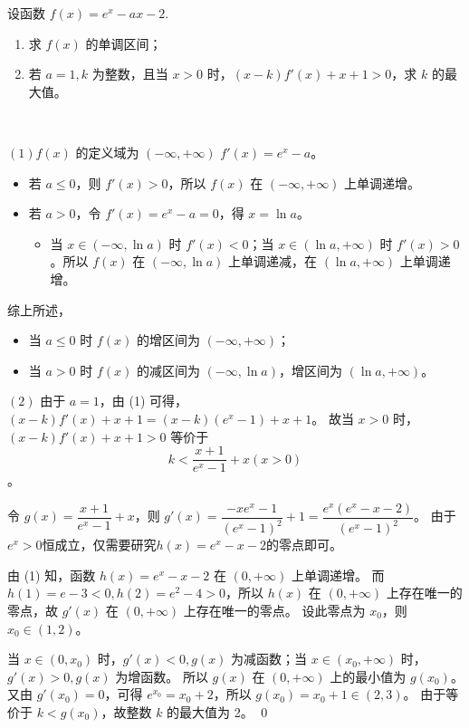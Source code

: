 \begin{example}[2012课标全国卷]
    设函数 $f(x) = e^x - ax - 2$.

\begin{enumerate}
    \item 求 $f(x)$ 的单调区间；
    \item 若 $a = 1, k$ 为整数，且当 $x > 0$ 时，$(x-k)f'(x) + x + 1 > 0$，求 $k$ 的最大值。
\end{enumerate}
\end{example}

\begin{jie}
\ 


\((1)\)$f(x)$ 的定义域为 $(-\infty, +\infty)$ $f'(x) = e^x - a$。
        \begin{itemize}
            \item 若 $a \leq 0$，则 $f'(x) > 0$，所以 $f(x)$ 在 $(-\infty, +\infty)$ 上单调递增。
            \item 若 $a > 0$，令 $f'(x) = e^x - a = 0$，得 $x = \ln a$。
            \begin{itemize}
                \item 当 $x \in (-\infty, \ln a)$ 时 $f'(x) < 0$；当 $x \in (\ln a, +\infty)$ 时 $f'(x) > 0$。所以 $f(x)$ 在 $(-\infty, \ln a)$ 上单调递减，在 $(\ln a, +\infty)$ 上单调递增。
            \end{itemize}
        \end{itemize}
        综上所述，
        \begin{itemize}
            \item 当 $a \leq 0$ 时 $f(x)$ 的增区间为 $(-\infty, +\infty)$；
            \item 当 $a > 0$ 时 $f(x)$ 的减区间为 $(-\infty, \ln a)$，增区间为 $(\ln a, +\infty)$。
        \end{itemize}

\((2)\)  
由于 $a = 1$，由 (1) 可得，$(x-k)f'(x) + x + 1 = (x-k)(e^x - 1) + x + 1$。
故当 $x > 0$ 时，$(x-k)f'(x) + x + 1 > 0$ 等价于 $$k < \frac{x+1}{e^x - 1} + x (x > 0)$$。

 令 $g(x) = \dfrac{x+1}{e^x - 1} + x$，则 $g'(x) = \dfrac{-xe^x - 1}{(e^x - 1)^2} + 1 = \dfrac{e^x(e^x - x - 2)}{(e^x - 1)^2}$。
 由于\(e^x>0\)恒成立，仅需要研究\(h(x) = e^x - x - 2\)的零点即可。
 
 由 (1) 知，函数 $h(x) = e^x - x - 2$ 在 $(0, +\infty)$ 上单调递增。
而 $h(1) = e - 3 < 0, h(2) = e^2 - 4 > 0$，所以 $h(x)$ 在 $(0, +\infty)$ 上存在唯一的零点，故 $g'(x)$ 在 $(0, +\infty)$ 上存在唯一的零点。
 设此零点为 $x_0$，则 $x_0 \in (1, 2)$。

当 $x \in (0, x_0)$ 时，$g'(x) < 0, g(x)$ 为减函数；当 $x \in (x_0, +\infty)$ 时，$g'(x) > 0, g(x)$ 为增函数。
 所以 $g(x)$ 在 $(0, +\infty)$ 上的最小值为 $g(x_0)$。
 又由 $g'(x_0) = 0$，可得 $e^{x_0} = x_0 + 2$，所以 $g(x_0) = x_0 + 1 \in (2, 3)$。
由于等价于 $k < g(x_0)$，故整数 $k$ 的最大值为 2。
\qed
\end{jie}
